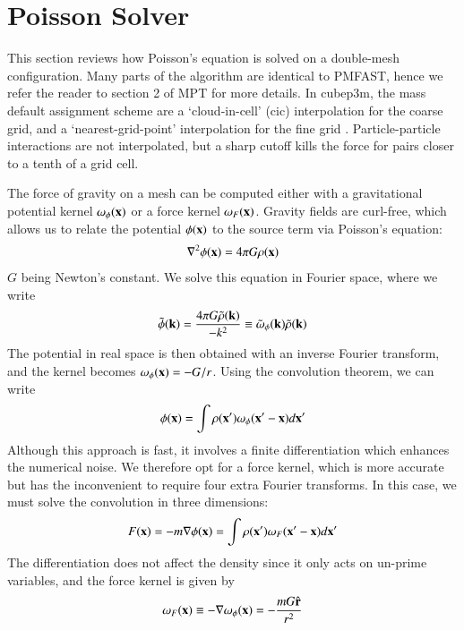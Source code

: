 \section{Poisson Solver}
\label{sec:Poisson}


This section reviews how Poisson's equation is solved on a double-mesh configuration. 
Many parts of the algorithm are identical to {\small PMFAST}, hence we refer the reader 
to section 2 of MPT for more details. In cubep3m, the mass default assignment scheme are
a `cloud-in-cell' (cic) interpolation for the coarse grid,  and a `nearest-grid-point' interpolation 
for the fine grid \citep{Hockney}. Particle-particle interactions are not interpolated, but a sharp cutoff kills the force
for pairs closer to a tenth of a grid cell. 

The force of gravity on a mesh can be computed either with a gravitational potential  kernel $\omega_{\phi} ({\bf x})$
  or a force  kernel $\omega_{F} ({\bf x})$.
Gravity fields are curl-free, which allows us to relate the potential $\phi({\bf x})$ to the source term via Poisson's equation: 
\begin{eqnarray}
\nabla^{2}\phi({\bf x}) = 4 \pi G \rho({\bf x})
\label{eq:poisson}
\end{eqnarray}
$G$ being Newton's constant. We solve this equation in Fourier space, where we write
\begin{eqnarray}
 \tilde{\phi}({\bf k}) = \frac{4 \pi G \tilde{\rho}({\bf k})}{- k^{2}} \equiv \tilde{\omega}_{\phi}({\bf k})\tilde{\rho}({\bf k})
\label{eq:poissonFourier}
\end{eqnarray}
The potential in real space is then obtained with an inverse Fourier transform, and the kernel becomes $\omega_{\phi} ({\bf x}) = -G/r$.
Using the convolution theorem, we can write
\begin{eqnarray}
 \phi({\bf x}) = \int \rho({\bf x'}) \omega_{\phi}({\bf x'} - {\bf x}) d{\bf x'}
\label{eq:poisson_solution_pot}
\end{eqnarray}
Although this approach is fast, it involves a finite differentiation which enhances the numerical noise.
We therefore opt for a force kernel, which is more accurate but has the inconvenient to require four extra Fourier transforms.
In this case, we must solve the convolution in three dimensions:
\begin{eqnarray}
 F({\bf x}) = - m {\bf \nabla} \phi({\bf x})   = \int \rho({\bf x'}) {\bf  \omega}_{F}({\bf x'} - {\bf x}) d{\bf x'}                                      
\label{eq:poisson_solution_force}
\end{eqnarray}
The differentiation does not affect the density since it only acts on un-prime variables,
and the force kernel is given by 
\begin{eqnarray}
{\bf  \omega}_{F}({\bf x}) \equiv - {\bf \nabla}\omega_{\phi}({\bf x}) = - \frac{mG \hat{\bf r}}{r^{2}}
\end{eqnarray}

